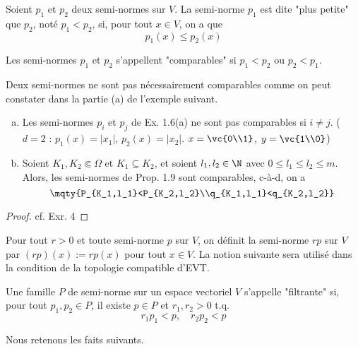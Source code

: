 \begin{definition} %
	Soient $p_1$ et $p_2$ deux semi-normes sur $V$. La semi-norme $p_1$ est dite "plus petite" que $p_2$, noté $p_1<p_2$, si, pour tout $x\in V$, on a que
	\[p_1(x)≤p_2(x)\]
	
	Les semi-normes $p_1$ et $p_2$ s'appellent "comparables" si $p_1<p_2$ ou $p_2<p_1$.
\end{definition}

Deux semi-normes ne sont pas nécessairement comparables comme on peut constater dans la partie (a) de l'exemple suivant.

\begin{example} %
	\begin{enumerate}[(a)]
		\item Les semi-normes $p_i$ et $p_j$ de Ex. 1.6(a) ne sont pas comparables si $i≠j$. ($d=2$ : $p_1(x)=|x_1|$, $p_2(x)=|x_2|$. $x=\vc{0\\1}$, $y=\vc{1\\0}$)
		\item Soient $K_1, K_2\Subset Ω$ et $K_1\subseteq K_2$, et soient $l_1, l_2\in \N$ avec $0≤l_1≤l_2≤m$. Alors, les semi-normes de Prop. 1.9 sont comparables, c-à-d, on a
		\[\mqty{P_{K_1,l_1}<P_{K_2,l_2}\\q_{K_1,l_1}<q_{K_2,l_2}}\]
	\end{enumerate}
	
\end{example}
\begin{proof} %
	cf. Exr. 4
\end{proof}

Pour tout $r>0$ et toute semi-norme $p$ sur $V$, on définit la semi-norme $rp$ sur $V$ par $(rp)(x):=rp(x)$ pour tout $x\in V$. La notion suivante sera utilisé dans la condition de la topologie compatible d'EVT.

\begin{definition}
	Une famille $P$ de semi-norme sur un espace vectoriel $V$ s'appelle "filtrante" si, pour tout $p_1,p_2 \in P$, il existe $p\in P$ et $r_1,r_2>0$ t.q.
		\[r_1p_1<p,\quad r_2p_2<p\]
\end{definition}

Nous retenons les faits suivants.

